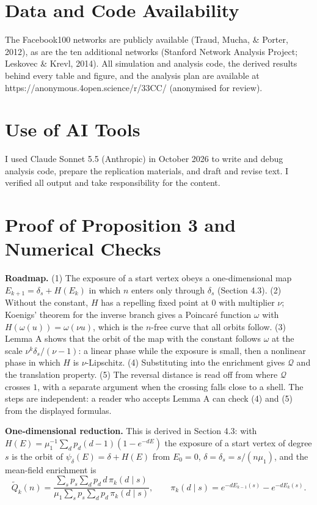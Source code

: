 \documentclass{nws}
\begin{document}
\section*{Data and Code Availability}

The Facebook100 networks are publicly available (Traud, Mucha, \& Porter, 2012), as are the ten additional networks (Stanford Network Analysis Project; Leskovec \& Krevl, 2014). All simulation and analysis code, the derived results behind every table and figure, and the analysis plan are available at https://anonymous.4open.science/r/33CC/ (anonymised for review).

\section*{Use of AI Tools}

I used Claude Sonnet 5.5 (Anthropic) in October 2026 to write and debug analysis code, prepare the replication materials, and draft and revise text. I verified all output and take responsibility for the content.


\appendix

\section{Proof of Proposition 3 and Numerical Checks}

\textbf{Roadmap.} (1) The exposure of a start vertex obeys a one-dimensional map $E_{k+1}=\delta_s+H(E_k)$ in which $n$ enters only through $\delta_s$ (Section 4.3). (2) Without the constant, $H$ has a repelling fixed point at $0$ with multiplier $\nu$; Koenigs' theorem for the inverse branch gives a Poincar\'e function $\omega$ with $H(\omega(u))=\omega(\nu u)$, which is the $n$-free curve that all orbits follow. (3) Lemma A shows that the orbit of the map with the constant follows $\omega$ at the scale $\nu^k\delta_s/(\nu-1)$: a linear phase while the exposure is small, then a nonlinear phase in which $H$ is $\nu$-Lipschitz. (4) Substituting into the enrichment gives $\mathcal Q$ and the translation property. (5) The reversal distance is read off from where $\mathcal Q$ crosses $1$, with a separate argument when the crossing falls close to a shell. The steps are independent: a reader who accepts Lemma A can check (4) and (5) from the displayed formulas.

\textbf{One-dimensional reduction.} This is derived in Section 4.3: with
$H(E)=\mu_1^{-1}\sum_dp_d(d-1)(1-e^{-dE})$ the exposure of a start vertex of degree
$s$ is the orbit of $\psi_\delta(E)=\delta+H(E)$ from $E_0=0$, $\delta=\delta_s=s/(n\mu_1)$,
and the mean-field enrichment is
\begin{equation*}
\tilde Q_k(n)=\frac{\sum_s p_s\sum_d p_d\,d\,\pi_k(d\mid s)}{\mu_1\sum_s p_s\sum_d p_d\,\pi_k(d\mid s)},\qquad
\pi_k(d\mid s)=e^{-dE_{k-1}(s)}-e^{-dE_k(s)} .
\end{equation*}
\end{document}
